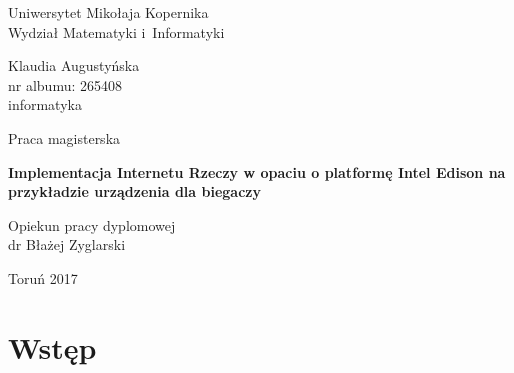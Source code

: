 \documentclass[a4paper,twoside,titlepage,openright]{book}
\begin{document}

\begin{titlepage}


\vspace*{1cm}
\begin{center}
\begin{Large}
Uniwersytet Mikołaja Kopernika\\[1mm]
Wydział Matematyki i~Informatyki\\[1mm]
\end{Large}
\end{center}

\vfill

\begin{center}
{\Large Klaudia Augustyńska}\\
nr albumu: 265408\\
informatyka
\end{center}

\vfill

\begin{center}
{\Large Praca magisterska}
\end{center}

\vspace{0.5cm}

\begin{center}
{\Huge \textbf{Implementacja Internetu Rzeczy w opaciu o platformę Intel Edison na przykładzie urządzenia dla biegaczy}}
\end{center}

\vspace{2cm}
\hfill
\begin{minipage}{6.5cm}
Opiekun pracy dyplomowej\\
dr Błażej Zyglarski
\end{minipage}

\vfill

\begin{center}
Toruń 2017
\end{center}

\end{titlepage}

\clearpage{\pagestyle{empty}\cleardoublepage}

\tableofcontents
 
\chapter*{Wstęp}
\end{document}
